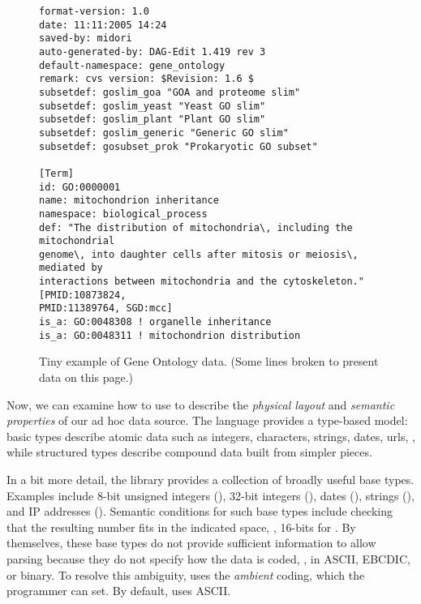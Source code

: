 \documentclass[11pt]{article}
\begin{document}
\begin{figure*}
\begin{small}
\begin{verbatim}
format-version: 1.0
date: 11:11:2005 14:24
saved-by: midori
auto-generated-by: DAG-Edit 1.419 rev 3
default-namespace: gene_ontology
remark: cvs version: $Revision: 1.6 $
subsetdef: goslim_goa "GOA and proteome slim"
subsetdef: goslim_yeast "Yeast GO slim"
subsetdef: goslim_plant "Plant GO slim"
subsetdef: goslim_generic "Generic GO slim"
subsetdef: gosubset_prok "Prokaryotic GO subset"

[Term]
id: GO:0000001
name: mitochondrion inheritance
namespace: biological_process
def: "The distribution of mitochondria\, including the mitochondrial 
genome\, into daughter cells after mitosis or meiosis\, mediated by 
interactions between mitochondria and the cytoskeleton." [PMID:10873824, 
PMID:11389764, SGD:mcc]
is_a: GO:0048308 ! organelle inheritance
is_a: GO:0048311 ! mitochondrion distribution

\end{verbatim}
\caption{Tiny example of Gene Ontology data. (Some lines broken to
present data on this page.)}
\label{figure:dibbler-records}
\end{small}
\end{figure*}

Now, we can examine how to use \pads{} to describe 
the {\em physical layout} and 
{\em semantic properties} of our ad hoc data source. 
The language provides a type-based model:
basic types describe atomic data such as integers, characters, 
strings, dates, urls, \etc, while
structured types describe compound data built from simpler pieces.
\suppressfloats

In a bit more detail,
the \pads{} library provides a collection of broadly useful base
types.  Examples include 8-bit unsigned integers (), 32-bit
integers (), dates (), strings (),
and IP addresses ().  Semantic conditions for such base types
include checking that the resulting number fits in the indicated
space, \ie, 16-bits for .  By themselves, these base types
do not provide sufficient information to allow parsing because they do
not specify how the data is coded, \ie{}, in ASCII, EBCDIC, or binary.
To resolve this ambiguity, \pads{} uses the \textit{ambient} coding,
which the programmer can set.  By default, \pads{} uses ASCII.  
\end{document}
